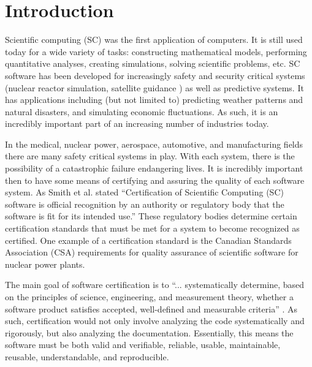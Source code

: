 \documentclass[10pt, preprint]{sigplanconf}
\begin{document}
\section{Introduction} 

Scientific computing (SC) was the first application of computers. It is still
used today for a wide variety of tasks: constructing mathematical models,
performing quantitative analyses, creating simulations, solving scientific
problems, etc. SC software has been developed for increasingly safety and
security critical systems (nuclear reactor simulation, satellite
guidance%
) as well as predictive
systems. %
It has applications including (but not limited to) predicting weather patterns
and natural disasters, and simulating economic fluctuations. As such, it is an
incredibly important part of an increasing number of industries
today.%

In the medical, nuclear power, aerospace, automotive, and manufacturing fields
there are many safety critical systems in play. With each system, there is the
possibility of a catastrophic failure endangering lives. It is incredibly
important then to have some means of certifying and assuring the quality of each
software system. As Smith et al. \cite{SmithEtAl2013} stated
``Certification of Scientiﬁc Computing (SC) software is official recognition by
an authority or regulatory body that the software is ﬁt for its intended use.''
These regulatory bodies determine certain certification standards that must be
met for a system to become recognized as certified. One example of a
certification standard is the Canadian Standards Association (CSA) requirements
for quality assurance of scientific software for nuclear power plants.

The main goal of software certification is to ``... systematically determine,
based on the principles of science, engineering, and measurement theory, whether
a software product satisfies accepted, well-defined and measurable criteria''
\cite{HHLMWW}. As such, certification would not only involve analyzing the code
systematically and rigorously, but also analyzing the
documentation. Essentially, this means the software must be both valid and
verifiable, reliable, usable, maintainable, reusable, understandable, and
reproducible. %
\end{document}
